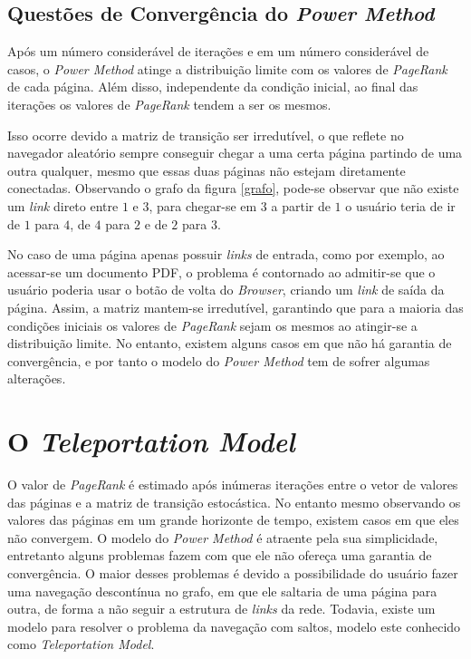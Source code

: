 \subsection{Questões de Convergência do \textit{Power Method}}%

Após um número considerável de iterações e em um número considerável de casos, o \textit{Power Method} atinge a distribuição limite com os valores de \textit{PageRank} de cada página. Além disso, independente da condição inicial, ao final das iterações os valores de \textit{PageRank} tendem a ser os mesmos.

Isso ocorre devido a matriz de transição ser irredutível, o que reflete no navegador aleatório sempre conseguir chegar a uma certa página partindo de uma outra qualquer, mesmo que essas duas páginas não estejam diretamente conectadas. Observando o grafo da figura \ref{grafo}, pode-se observar que não existe um \textit{link} direto entre $1$ e $3$, para chegar-se em $3$ a partir de $1$ o usuário teria de ir de $1$ para $4$, de $4$ para $2$ e de $2$ para $3$.

No caso de uma página apenas possuir \textit{links} de entrada, como por exemplo, ao acessar-se um documento PDF, o problema é contornado ao admitir-se que o usuário poderia usar o botão de volta do \textit{Browser}, criando um \textit{link} de saída da página. Assim, a matriz mantem-se irredutível, garantindo que para a maioria das condições iniciais os valores de \textit{PageRank} sejam os mesmos ao atingir-se a distribuição limite. No entanto, existem alguns casos em que não há garantia de convergência, e por tanto o modelo do \textit{Power Method} tem de sofrer algumas alterações. 


\section{O \textit{Teleportation Model}}%

O valor de \textit{PageRank} é estimado após inúmeras iterações entre o vetor de valores das páginas e a matriz de transição estocástica. No entanto mesmo observando os valores das páginas em um grande horizonte de tempo, existem casos em que eles não convergem. O modelo do \textit{Power Method} é atraente pela sua simplicidade, entretanto alguns problemas fazem com que ele não ofereça uma garantia de convergência. O maior desses problemas é devido a possibilidade do usuário fazer uma navegação descontínua no grafo, em que ele saltaria de uma página para outra, de forma a não seguir a estrutura de \textit{links} da rede. Todavia, existe um modelo para resolver o problema da navegação com saltos, modelo este conhecido como \textit{Teleportation Model}. 

